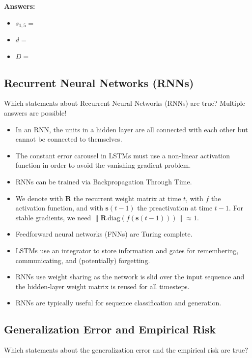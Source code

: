 \documentclass{article}
\begin{document}
\textbf{Answers:}
\begin{itemize}
    \item \(s_{1,5} =\)
    \item \(d = \)
    \item \(D = \)
\end{itemize}

\subsection*{Recurrent Neural Networks (RNNs)}

Which statements about Recurrent Neural Networks (RNNs) are true? Multiple answers are possible!

\begin{itemize}
    \item[(a)] In an RNN, the units in a hidden layer are all connected with each other but cannot be connected to themselves.
    \item[(b)] The constant error carousel in LSTMs must use a non-linear activation function in order to avoid the vanishing gradient problem.
    \item[(c)] RNNs can be trained via Backpropagation Through Time.
    \item[(d)] We denote with \(\mathbf{R}\) the recurrent weight matrix at time \(t\), with \(f\) the activation function, and with \(\mathbf{s}(t-1)\) the preactivation at time \(t-1\). For stable gradients, we need \(\|\mathbf{R} \, \text{diag}(f(\mathbf{s}(t-1)))\| \approx 1\).
    \item[(e)] Feedforward neural networks (FNNs) are Turing complete.
    \item[(f)] LSTMs use an integrator to store information and gates for remembering, communicating, and (potentially) forgetting.
    \item[(g)] RNNs use weight sharing as the network is slid over the input sequence and the hidden-layer weight matrix is reused for all timesteps.
    \item[(h)] RNNs are typically useful for sequence classification and generation.
\end{itemize}

\subsection*{Generalization Error and Empirical Risk}

Which statements about the generalization error and the empirical risk are true?
\end{document}

